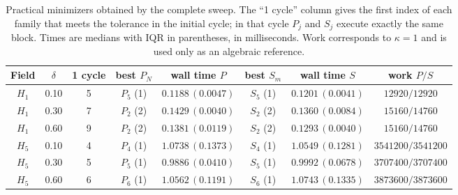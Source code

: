 \begin{table}[htbp]
\centering
\scriptsize
\caption{Practical minimizers obtained by the complete sweep. The ``1 cycle'' column gives the first index of each family that meets the tolerance in the initial cycle; in that cycle $P_j$ and $S_j$ execute exactly the same block. Times are medians with IQR in parentheses, in milliseconds. Work corresponds to $\kappa=1$ and is used only as an algebraic reference.}
\label{tab:practical-minima-P-S}
\begin{tabular}{cccccccc}
\toprule
Field & $\delta$ & 1 cycle & best $P_N$ & wall time $P$ & best $S_m$ & wall time $S$ & work $P/S$\\
\midrule
$H_1$ & 0.10 & 5 & $P_5$ (1) & $0.1188\,(0.0047)$ & $S_5$ (1) & $0.1201\,(0.0041)$ & $12920/12920$\\
$H_1$ & 0.30 & 7 & $P_2$ (2) & $0.1429\,(0.0040)$ & $S_2$ (2) & $0.1360\,(0.0084)$ & $15160/14760$\\
$H_1$ & 0.60 & 9 & $P_2$ (2) & $0.1381\,(0.0119)$ & $S_2$ (2) & $0.1293\,(0.0040)$ & $15160/14760$\\
$H_5$ & 0.10 & 4 & $P_4$ (1) & $1.0738\,(0.1373)$ & $S_4$ (1) & $1.0549\,(0.1281)$ & $3541200/3541200$\\
$H_5$ & 0.30 & 5 & $P_5$ (1) & $0.9886\,(0.0410)$ & $S_5$ (1) & $0.9992\,(0.0678)$ & $3707400/3707400$\\
$H_5$ & 0.60 & 6 & $P_6$ (1) & $1.0562\,(0.1191)$ & $S_6$ (1) & $1.0743\,(0.1335)$ & $3873600/3873600$\\
\bottomrule
\end{tabular}
\end{table}
